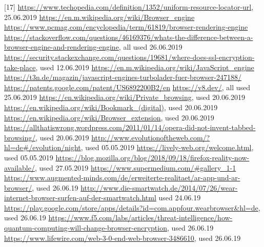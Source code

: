 \documentclass[runningheads]{llncs}
\begin{document}
	[17] \url{https://www.techopedia.com/definition/1352/uniform-resource-locator-url}, 25.06.2019
	\newline
	[18]
	\url{https://en.m.wikipedia.org/wiki/Browser_engine}
	\newline
	\url{https://www.pcmag.com/encyclopedia/term/61819/browser-rendering-engine}
	\newline
	\url{https://stackoverflow.com/questions/46169376/whats-the-difference-between-a-browser-engine-and-rendering-engine}, all used 26.06.2019
	\newline
	[19]\url{https://security.stackexchange.com/questions/19681/where-does-ssl-encryption-take-place}, used 12.06.2019
	\newline
	[20] \url{https://en.m.wikipedia.org/wiki/JavaScript_engine}
	\newline \url{https://t3n.de/magazin/javascript-engines-turbolader-fuer-browser-247188/}
	\newline
	\url{https://patents.google.com/patent/US6892200B2/en}
	\newline
	\url{https://v8.dev/}, all used 25.06.2019
	\newline
	[21] \url{https://en.wikipedia.org/wiki/Private_browsing}, used 20.06.2019
	\newline
	[22] \url{https://en.wikipedia.org/wiki/Bookmark_(digital)}, used 20.06.2019
	\newline
	[23] \url{https://en.wikipedia.org/wiki/Browser_extension}, used 20.06.2019
	\newline
	[24] \url{https://allthatiswrong.wordpress.com/2011/01/14/opera-did-not-invent-tabbed-browsing/}, used 20.06.2019
	\newline
	[25] \url{http://www.evolutionoftheweb.com/?hl=de#/evolution/night}, used 05.05.2019
	\newline
	[26] \url{
	https://lively-web.org/welcome.html}, used 05.05.2019
	\newline
	[27] \url{https://blog.mozilla.org/blog/2018/09/18/firefox-reality-now-available/}, used 27.05.2019
	\newline
	[28]
	\url{https://www.supermedium.com/#gallery_1-1}
	\newline
	[29] \url{https://www.augmented-minds.com/de/erweiterte-realitaet/ar-app-und-ar-browser/}, used 26.06.19
	\newline
	[30]
	\url{http://www.die-smartwatch.de/2014/07/26/wear-internet-browser-surfen-auf-der-smartwatch.html} used 24.06.19
	\newline
	[31] \url{
	https://play.google.com/store/apps/details?id=com.appfour.wearbrowser&hl=de}, used 26.06.19
	\newline
	[32] \url{	https://www.f5.com/labs/articles/threat-intelligence/how-quantum-computing-will-change-browser-encryption}, used 26.06.19
	\newline
	[33] \url{
	https://www.lifewire.com/web-3-0-end-web-browser-3486610}, used 26.06.19
	\newline
\end{document}
